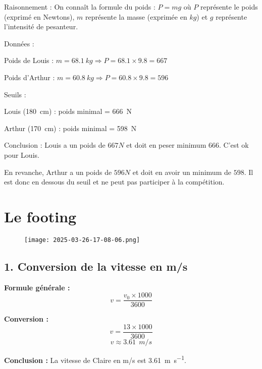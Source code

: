 \documentclass[a4paper,12pt]{article}
\begin{document}
\begin{compactitem}
  \item Raisonnement : On connaît la formule du poids : $P = mg$ où $P$ représente le poids (exprimé en Newtons), $m$ représente la masse (exprimée en $kg$) et $g$ représente l'intensité de pesanteur.
  \item Données : 
  \begin{compactitem}
      \item Poids de Louis : $m = \SI{68.1}{kg} \Rightarrow P = 68.1 \times 9.8 = 667$
      \item Poids d'Arthur : $m = \SI{60.8}{kg} \Rightarrow P = 60.8 \times 9.8 = 596$
  \end{compactitem}
  \item Seuils :
  \begin{compactitem}
      \item Louis (\SI{180}{cm}) : poids minimal = \SI{666}{N}
      \item Arthur (\SI{170}{cm}) : poids minimal = \SI{598}{N}
  \end{compactitem}
  \item Conclusion : Louis a un poids de $667 N$ et doit en peser minimum $666$. C'est ok pour Louis. 
  \item En revanche, Arthur a un poids de $596 N$ et doit en avoir un minimum de $598$. Il est donc en dessous du seuil et ne peut pas participer à la compétition.
\end{compactitem}










\section*{Le footing}

\begin{figure}[H]
  \centering
  \texttt{[image: 2025-03-26-17-08-06.png]}
\end{figure}

\subsection*{1. Conversion de la vitesse en m/s}
\begin{compactitem}
    \item \textbf{Formule générale :}
    \begin{equation}
        v = \frac{v_0 \times 1000}{3600}
    \end{equation}
    \item \textbf{Conversion :}
    \begin{equation}
        v = \frac{13 \times 1000}{3600}
    \end{equation}
    \begin{equation}
        v \approx 3.61\ \SI{}{m\per s}
    \end{equation}
    \item \textbf{Conclusion :} La vitesse de Claire en m/s est \SI{3.61}{m\per s}.
\end{compactitem}
\end{document}

